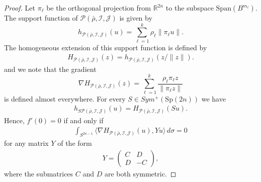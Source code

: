 \documentclass[12pt]{amsart}
\theoremstyle{definition}
\newcommand{\RR}{{\mathbb R}}
\begin{document}
\begin{proof}
Let $\pi_\ell$ be the orthogonal projection from $\RR^{2n}$  to the subspace $\mathrm{Span}(B^{m_\ell})$. The support function of $\mathcal{P}(\bar{\rho},\mathcal{I},\mathcal{J})$ is given by 
    \begin{equation*}
        h_{\mathcal{P}(\bar{\rho},\mathcal{I},\mathcal{J})}(u) = \sum_{\ell=1}^k \rho_\ell \| \pi_{\ell}u \|.
    \end{equation*}
The homogeneous extension of this support function is defined by 
\begin{align*}
    H_{\mathcal{P}(\bar{\rho},\mathcal{I},\mathcal{J})}(z)  = h_{\mathcal{P}(\bar{\rho},\mathcal{I},\mathcal{J})} \left( z/ \|z\|\right).
\end{align*}
and we note that the gradient $$\nabla H_{\mathcal{P}(\bar{\rho},\mathcal{I},\mathcal{J})}(z) = \sum_{\ell=1}^k \frac{\rho_\ell  \pi_\ell z}{\| \pi_\ell z\|}$$ is defined almost everywhere. 
For every  $S \in Sym^+(\mathrm{Sp}(2n))$ we have \begin{align}\label{eq;trans}
    h_{S{\mathcal{P}(\bar{\rho},\mathcal{I},\mathcal{J})}}(u) = H_{\mathcal{P}(\bar{\rho},\mathcal{I},\mathcal{J})}(S u).
\end{align}
Hence, $f'(0)=0$ if and only if 
\begin{align}\label{eq:zero}
    \int_{S^{2n-1}} \langle \nabla H_{\mathcal{P}(\bar{\rho},\mathcal{I},\mathcal{J})}(u), Y u \rangle \, d\sigma =0
\end{align}
for any matrix $Y$ of the form  
\begin{align*}
    Y = \begin{pmatrix}
    C & D\\
    D & -C
    \end{pmatrix}, 
\end{align*}
where the submatrices $C$ and $D$ are both symmetric. 


\end{proof}
\end{document}
